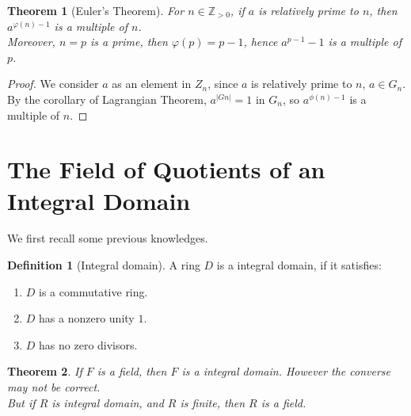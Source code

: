 \documentclass{article}
\theoremstyle{MyNonumberplain}
\theoremstyle{break}
\newtheorem*{proof}{Proof. }
\theoremstyle{break}
\newtheorem{theorem}{Theorem}[section]
\theoremstyle{break}
\theoremstyle{definition}
\theoremstyle{break}
\newtheorem{definition}{Definition}[section]
\begin{document}
\begin{thmbox}
    \begin{theorem}[Euler's Theorem]
        For $n \in \mathbb{Z}_{> 0}$, if $a$ is relatively prime to $n$, then
        $a^{\varphi (n) - 1}$ is a multiple of $n$.\\
        
        Moreover, $n = p$ is a prime, then $\varphi (p) = p - 1$, hence $a^{p - 1} -
        1$ is a multiple of $p$.

    \end{theorem}
    \begin{prfbox}
        \begin{proof}
            We consider $a$ as an element in $Z_n$, since $a$ is relatively prime to $n$, $a \in G_n$. By the corollary
            of Lagrangian Theorem, $a^{|Gn|} = 1$ in $G_n$, so $a^{\phi(n)-1}$ is a multiple of $n$.
        \end{proof}
    \end{prfbox}
\end{thmbox}

\newpage

\section{The Field of Quotients of an Integral Domain}

We first recall some previous knowledges.

\begin{defbox}
    \begin{definition}[Integral domain]
        A ring $D$ is a integral domain, if it satisfies:\\
        \begin{enumerate}
          \item $D$ is a commutative ring.\\
          
          \item $D$ has a nonzero unity $1$.\\
          
          \item $D$ has no zero divisors.
        \end{enumerate}
    \end{definition}
\end{defbox}

\begin{thmbox}
    \begin{theorem}
        If $F$ is a field, then $F$ is a integral domain. However the converse may not
        be correct.\\
        
        But if $R$ is integral domain, and $R$ is finite, then $R$ is a field.
    \end{theorem}
\end{thmbox}
\end{document}
